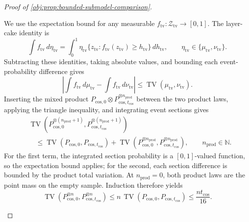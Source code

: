 \documentclass[11pt]{article}
\begin{document}
\begin{proof}[Proof of \cref{obj:prop:bounded-submodel-comparison}]
\begin{enumerate}
We use the expectation bound for any measurable
\(f_{\mathrm{tv}}:\mathcal Z_{\mathrm{tv}}\to[0,1]\). The layer-cake identity is
\[
\int f_{\mathrm{tv}}\,d\eta_{\mathrm{tv}}
=
\int_0^1
\eta_{\mathrm{tv}}
\{z_{\mathrm{tv}}:f_{\mathrm{tv}}(z_{\mathrm{tv}})\ge h_{\mathrm{tv}}\}
\,dh_{\mathrm{tv}},
\qquad
\eta_{\mathrm{tv}}\in\{\mu_{\mathrm{tv}},\nu_{\mathrm{tv}}\}.
\]
Subtracting these identities, taking absolute values, and bounding each event-probability difference gives
\[
\left|
\int f_{\mathrm{tv}}\,d\mu_{\mathrm{tv}}
-\int f_{\mathrm{tv}}\,d\nu_{\mathrm{tv}}
\right|
\le\operatorname{TV}(\mu_{\mathrm{tv}},\nu_{\mathrm{tv}}).
\]
Inserting the mixed product
\(P_{\mathrm{cos},0}\otimes
P_{\mathrm{cos},t_{\mathrm{cos}}}^{\otimes n_{\mathrm{prod}}}\)
between the two product laws, applying the triangle inequality, and integrating event sections gives
\[
\begin{split}
&\operatorname{TV}
\left(
P_{\mathrm{cos},0}^{\otimes(n_{\mathrm{prod}}+1)},
P_{\mathrm{cos},t_{\mathrm{cos}}}^{\otimes(n_{\mathrm{prod}}+1)}
\right)\\
&\quad\le
\operatorname{TV}(P_{\mathrm{cos},0},P_{\mathrm{cos},t_{\mathrm{cos}}})
+
\operatorname{TV}
\left(
P_{\mathrm{cos},0}^{\otimes n_{\mathrm{prod}}},
P_{\mathrm{cos},t_{\mathrm{cos}}}^{\otimes n_{\mathrm{prod}}}
\right),
\qquad n_{\mathrm{prod}}\in\mathbb N.
\end{split}
\]
For the first term, the integrated section probability is a \([0,1]\)-valued function, so the expectation bound applies; for the second, each section difference is bounded by the product total variation. At \(n_{\mathrm{prod}}=0\), both product laws are the point mass on the empty sample. Induction therefore yields
\[
\operatorname{TV}
\left(
P_{\mathrm{cos},0}^{\otimes n},
P_{\mathrm{cos},t_{\mathrm{cos}}}^{\otimes n}
\right)
\le
n\,\operatorname{TV}
(P_{\mathrm{cos},0},P_{\mathrm{cos},t_{\mathrm{cos}}})
\le\frac{nt_{\mathrm{cos}}}{16}.
\]


\end{enumerate}
\end{proof}
\end{document}
